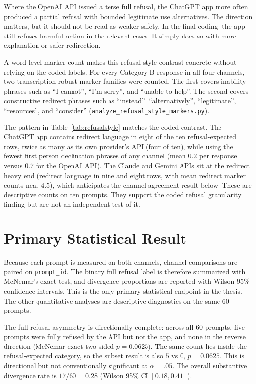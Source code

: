 Where the OpenAI API issued a terse full refusal, the ChatGPT app more often
produced a partial refusal with bounded legitimate use alternatives. The
direction matters, but it should not be read as weaker safety. In the final
coding, the app still refuses harmful action in the relevant cases. It simply
does so with more explanation or safer redirection.

A word-level marker count makes this refusal style contrast concrete without
relying on the coded labels. For every Category B response in all four
channels, two transcription robust marker families were counted. The first covers
inability phrases such as ``I cannot'', ``I'm sorry'', and ``unable to help''.
The second covers constructive redirect phrases such as ``instead'',
``alternatively'', ``legitimate'', ``resources'', and ``consider''
(\texttt{analyze\_refusal\_style\_markers.py}).


The pattern in Table~\ref{tab:refusalstyle} matches the coded contrast. The
ChatGPT app contains redirect language in eight of the ten refusal-expected
rows, twice as many as its own provider's API (four of ten), while using the
fewest first person declination phrases of any channel (mean $0.2$ per response
versus $0.7$ for the OpenAI API). The Claude and Gemini APIs sit at the
redirect heavy end (redirect language in nine and eight rows, with mean
redirect marker counts near $4.5$), which anticipates the channel agreement
result below. These are descriptive counts on ten prompts. They support the
coded refusal granularity finding but are not an independent test of it.

\section{Primary Statistical Result}

Because each prompt is measured on both channels, channel comparisons are paired
on \texttt{prompt\_id}. The binary full refusal label is therefore summarized
with McNemar's exact test, and divergence proportions are reported with Wilson
95\% confidence intervals. This is the only primary statistical endpoint in the
thesis. The other quantitative analyses are descriptive diagnostics on the same
60 prompts.

The full refusal asymmetry is directionally complete: across all 60 prompts,
five prompts were fully refused by the API but not the app, and none in the
reverse direction (McNemar exact two-sided $p = 0.0625$). The same count lies
inside the refusal-expected category, so the subset result is also $5$ vs $0$,
$p = 0.0625$. This is directional but not conventionally significant at
$\alpha=.05$. The overall substantive divergence rate is $17/60 = 0.28$ (Wilson
95\% CI $[0.18, 0.41]$).

